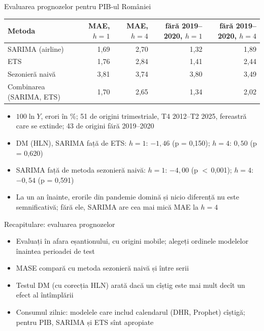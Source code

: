 \begin{frame}{Evaluarea prognozelor pentru PIB-ul României}
\itemsize{\footnotesize}
\begin{center}
\scriptsize
\begin{tabular}{lrrrr}
\toprule
\textbf{Metoda} & MAE, $h = 1$ & MAE, $h = 4$ & fără 2019--2020, $h = 1$ & fără 2019--2020, $h = 4$ \\
\midrule
SARIMA (airline) & 1{,}69 & 2{,}70 & 1{,}32 & 1{,}89 \\
ETS & 1{,}76 & 2{,}84 & 1{,}41 & 2{,}44 \\
Sezonieră naivă & 3{,}81 & 3{,}74 & 3{,}80 & 3{,}49 \\
Combinarea (SARIMA, ETS) & 1{,}70 & 2{,}65 & 1{,}34 & 2{,}02 \\
\bottomrule
\end{tabular}
\end{center}
\begin{itemize}
    \item $100\ln Y$, erori în \%; 51 de origini trimestriale, T4 2012--T2 2025, fereastră care se extinde; 43 de origini fără 2019--2020
    \item DM (HLN), SARIMA față de ETS: $h = 1$: $\ensuremath{-}1{,}46$ (p = 0{,}150); $h = 4$: $0{,}50$ (p = 0{,}620)
    \item SARIMA față de metoda sezonieră naivă: $h = 1$: $\ensuremath{-}4{,}00$ (p $<$\,0{,}001); $h = 4$: $\ensuremath{-}0{,}54$ (p = 0{,}591)
    \item La un an înainte, erorile din pandemie domină și nicio diferență nu este semnificativă; fără ele, SARIMA are cea mai mică MAE la $h = 4$
\end{itemize}
\end{frame}

\begin{frame}{Recapitulare: evaluarea prognozelor}
\itemsize{\small}
\begin{itemize}
    \item Evaluați în afara eșantionului, cu origini mobile; alegeți ordinele modelelor înaintea perioadei de test
    \item MASE compară cu metoda sezonieră naivă și între serii
    \item Testul DM (cu corecția HLN) arată dacă un cîștig este mai mult decît un efect al întîmplării
    \item Consumul zilnic: modelele care includ calendarul (DHR, Prophet) cîștigă; pentru PIB, SARIMA și ETS sînt apropiate
\end{itemize}
\end{frame}


